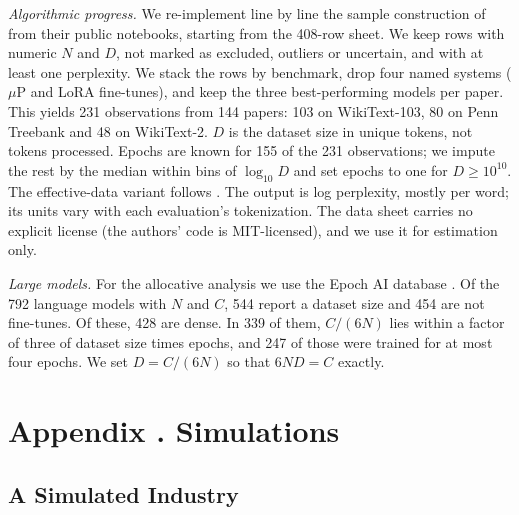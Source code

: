 \documentclass[AER,finalmode]{AEA}
\theoremstyle{definition}
\theoremstyle{remark}
\begin{document}
\textit{Algorithmic progress.} We re-implement line by line the sample construction of \citet{ho2024algorithmic} from
their public notebooks, starting from the 408-row sheet. We keep rows with numeric $N$ and $D$, not marked as excluded,
outliers or uncertain, and with at least one perplexity. We stack the rows by benchmark, drop four named systems ($\mu$P
and LoRA fine-tunes), and keep the three best-performing models per paper. This yields 231 observations from 144
papers: 103 on WikiText-103, 80 on Penn Treebank and 48 on WikiText-2. $D$ is the dataset size in unique tokens, not
tokens processed. Epochs are known for 155 of the 231 observations; we impute the rest by the median within bins of
$\log_{10}D$ and set epochs to one for $D\ge10^{10}$. The effective-data variant follows \citet{muennighoff2023scaling}.
The output is log perplexity, mostly per word; its units vary with each evaluation's tokenization. The data sheet
carries no explicit license (the authors' code is MIT-licensed), and we use it for estimation only.

\textit{Large models.} For the allocative analysis we use the Epoch AI database \citep{epochai2026data}. Of the 792
language models with $N$ and $C$, 544 report a dataset size and 454 are not fine-tunes. Of these, 428 are dense. In 339
of them, $C/(6N)$ lies within a factor of three of dataset size times epochs, and 247 of those were trained for at most
four epochs. We set $D=C/(6N)$ so that $6ND=C$ exactly.

\section[Simulations]{Appendix \thesection. Simulations}\label{app:mc}

\subsection{A Simulated Industry}\label{app:mc-industry}
\end{document}
